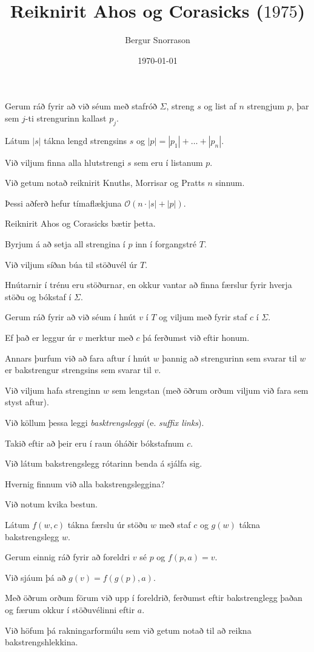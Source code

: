 \title{Reiknirit Ahos og Corasicks ($1975$)}
\author{Bergur Snorrason}
\date{\today}



\frame{\titlepage}

{
	{
		\item<1-> Gerum ráð fyrir að við séum með stafróð $\Sigma$, streng $s$ og list af $n$ strengjum $p$, þar sem $j$-ti strengurinn kallast $p_j$.
		\item<2-> Látum $|s|$ tákna lengd strengsins $s$ og $|p| = |p_1| + \dots + |p_n|$.
		\item<3-> Við viljum finna alla hlutstrengi $s$ sem eru í listanum $p$.
		\item<4-> Við getum notað reiknirit Knuths, Morrisar og Pratts $n$ sinnum.
		\item<5-> Þessi aðferð hefur tímaflækjuna $\mathcal{O}(n \cdot |s| + |p|)$.
		\item<6-> Reiknirit Ahos og Corasicks bætir þetta.
	}
}

{
	{
		\item<1-> Byrjum á að setja all strengina í $p$ inn í forgangstré $T$.
		\item<2-> Við viljum síðan búa til stöðuvél úr $T$.
		\item<3-> Hnútarnir í trénu eru stöðurnar, en okkur vantar að finna færslur fyrir hverja stöðu og bókstaf í $\Sigma$.
		\item<4-> Gerum ráð fyrir að við séum í hnút $v$ í $T$ og viljum með fyrir staf $c$ í $\Sigma$.
		\item<5-> Ef það er leggur úr $v$ merktur með $c$ þá ferðumst við eftir honum.
		\item<6-> Annars þurfum við að fara aftur í hnút $w$ þannig að strengurinn sem svarar til $w$ er bakstrengur strengsins sem svarar til $v$.
		\item<7-> Við viljum hafa strenginn $w$ sem lengstan (með öðrum orðum viljum við fara sem styst aftur).
		\item<8-> Við köllum þessa leggi \emph{basktrengsleggi} (e. \emph{suffix links}).
		\item<9-> Takið eftir að þeir eru í raun óháðir bókstafnum $c$.
		\item<10-> Við látum bakstrengslegg rótarinn benda á sjálfa sig.
	}
}

{
	{
		\item<1-> Hvernig finnum við alla bakstrengsleggina?
		\item<2-> Við notum kvika bestun.
		\item<3-> Látum $f(w, c)$ tákna færslu úr stöðu $w$ með staf $c$ og $g(w)$ tákna bakstrengslegg $w$.
		\item<4-> Gerum einnig ráð fyrir að foreldri $v$ sé $p$ og $f(p, a) = v$.
		\item<5-> Við sjáum þá að $g(v) = f(g(p), a)$.
		\item<6-> Með öðrum orðum förum við upp í foreldrið, ferðumst eftir bakstrenglegg þaðan og færum okkur í stöðuvélinni eftir $a$.
		\item<7-> Við höfum þá rakningarformúlu sem við getum notað til að reikna bakstrengshlekkina.
	}
}

